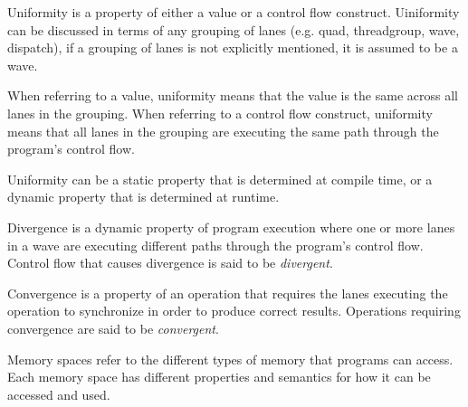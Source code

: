
\p Uniformity is a property of either a value or a control flow construct.
Uiniformity can be discussed in terms of any grouping of \gls{lane}s (e.g.
\gls{quad}, \gls{threadgroup}, \gls{wave}, \gls{dispatch}), if a grouping of
\gls{lane}s is not explicitly mentioned, it is assumed to be a \gls{wave}.

\p When referring to a value, uniformity means that the value is the same across
all \gls{lane}s in the grouping. When referring to a control flow construct,
uniformity means that all \gls{lane}s in the grouping are executing the same
path through the program's control flow.

\p Uniformity can be a static property that is determined at compile time, or a
dynamic property that is determined at runtime.


\p Divergence is a dynamic property of program execution where one or more
\gls{lane}s in a \gls{wave} are executing different paths through the program's
control flow. Control flow that causes divergence is said to be
\textit{divergent}.


\p Convergence is a property of an operation that requires the \gls{lane}s
executing the operation to synchronize in order to produce correct results.
Operations requiring convergence are said to be \textit{convergent}.


\p Memory spaces refer to the different types of memory that programs can
access. Each memory space has different properties and semantics for how it can
be accessed and used.
